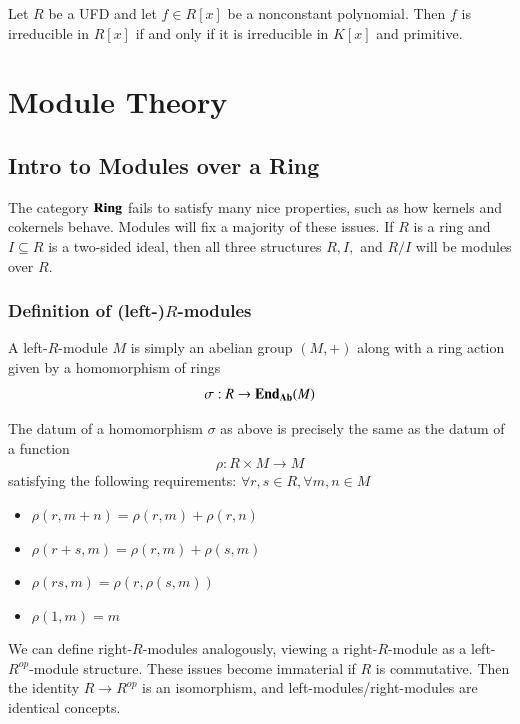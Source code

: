 \documentclass[12pt, a4paper, oneside, openright, titlepage]{book}
\begin{document}
\begin{cor}
    Let $R$ be a UFD and let $f \in R[x]$ be a nonconstant polynomial. Then $f$ is irreducible in $R[x]$ if and only if it is irreducible in $K[x]$ and primitive.
\end{cor}




\part{Module Theory}

\chapter{Intro to Modules over a Ring}

The category $\normalfont\textbf{Ring}$ fails to satisfy many nice properties, such as how kernels and cokernels behave. Modules will fix a majority of these issues. If $R$ is a ring and $I \subseteq R$ is a two-sided ideal, then all three structures $R, I,$ and $R/I$ will be modules over $R$.

\section{Definition of (left-)$R$-modules}

A left-$R$-module $M$ is simply an abelian group $(M,+)$ along with a ring action given by a homomorphism of rings $$\sigma:R\rightarrow \mathbf{End}_{\normalfont\textbf{Ab}}(M)$$

\begin{prop}
    The datum of a homomorphism $\sigma$ as above is precisely the same as the datum of a function $$\rho:R\times M\rightarrow M$$ 
    satisfying the following requirements: $\forall r,s \in R,\forall m,n \in M$
    \begin{itemize}
        \item $\rho(r,m+n) = \rho(r,m)+\rho(r,n)$
        \item $\rho(r+s,m) = \rho(r,m) + \rho(s,m)$
        \item $\rho(rs,m) = \rho(r,\rho(s,m))$
        \item $\rho(1,m) = m$
    \end{itemize}
\end{prop}

We can define right-$R$-modules analogously, viewing a right-$R$-module as a left-$R^{op}$-module structure. These issues become immaterial if $R$ is commutative. Then the identity $R\rightarrow R^{op}$ is an isomorphism, and left-modules/right-modules are identical concepts.
\end{document}
